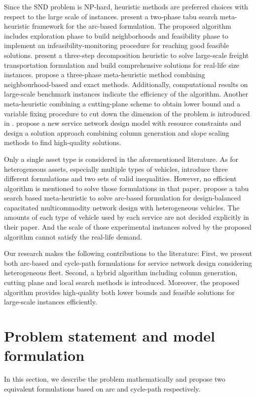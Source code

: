 \documentclass[11pt,nonblindrev,fleqn]{article}
\begin{document}
Since the SND problem is NP-hard, heuristic methods are preferred choices with respect to the large scale of instances. \cite{Pedersen2009Models} present a two-phase tabu search meta-heuristic framework for the arc-based formulation. The proposed algorithm includes exploration phase to build neighborhoods and feasibility phase to implement an infeasibility-monitoring procedure for reaching good feasible solutions. \cite{Teypaz2010A} present a three-step decomposition heuristic to solve large-scale freight transportation formulation and build comprehensive solutions for real-life size instances. \cite{VuDucToulouse} propose a three-phase meta-heuristic method combining neighbourhood-based and exact methods. Additionally, computational results on large-scale benchmark instances indicate the efficiency of the algorithm. Another meta-heuristic combining a cutting-plane scheme to obtain lower bound and a variable ﬁxing procedure to cut down the dimension of the problem is introduced in \cite{Chouman2015Cutting}. \cite{Crainic2016Service} propose a new service network design model with resource constraints and design a solution approach combining column generation and slope scaling methods to find high-quality solutions.

 Only a single asset type is considered in the aforementioned literature. As for heterogeneous assets, especially multiple types of vehicles, \cite{Kim1999Multimodal} introduce three different formulations and two sets of valid inequalities. However, no efficient algorithm is mentioned to solve those formulations in that paper. \cite{li2017design} propose a tabu search based meta-heuristic to solve arc-based formulation for design-balanced capacitated multicommodity network design with heterogeneous vehicles. The amounts of each type of vehicle used by each service are not decided explicitly in their paper. And the scale of those experimental instances solved by the proposed algorithm cannot satisfy the real-life demand.

Our research makes the following contributions to the literature: First, we present both arc-based and cycle-path formulations for service network design considering heterogeneous fleet. Second, a hybrid algorithm including column generation, cutting plane and local search methods is introduced. Moreover, the proposed algorithm provides high-quality both lower bounds and feasible solutions for large-scale instances efficiently.

\section{Problem statement and model formulation}\label{formulation}
In this section, we describe the problem mathematically and propose two equivalent formulations based on arc and cycle-path respectively.
\end{document}
